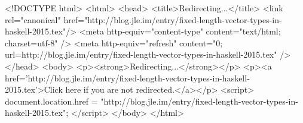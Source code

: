 <!DOCTYPE html>
<html>
<head>
<title>Redirecting...</title>
<link rel="canonical" href="http://blog.jle.im/entry/fixed-length-vector-types-in-haskell-2015.tex"/>
<meta http-equiv="content-type" content="text/html; charset=utf-8" />
<meta http-equiv="refresh" content="0; url=http://blog.jle.im/entry/fixed-length-vector-types-in-haskell-2015.tex" />
</head>
<body>
  <p><strong>Redirecting...</strong></p>
  <p><a href='http://blog.jle.im/entry/fixed-length-vector-types-in-haskell-2015.tex'>Click here if you are not redirected.</a></p>
  <script>
    document.location.href = "http://blog.jle.im/entry/fixed-length-vector-types-in-haskell-2015.tex";
  </script>
</body>
</html>
